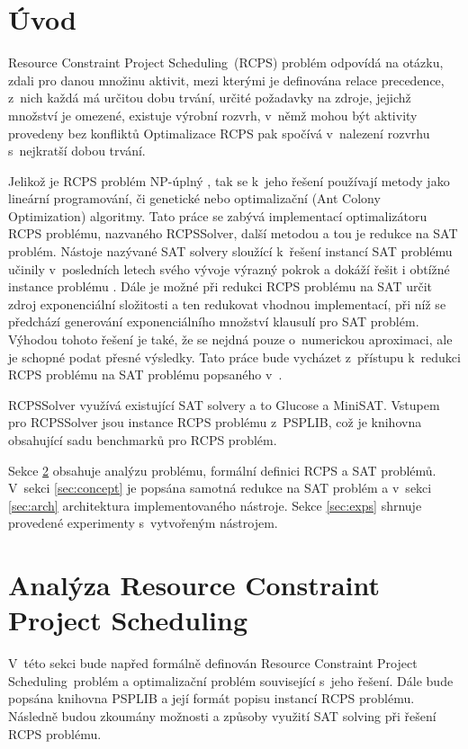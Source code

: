 \documentclass[a4paper, 12pt]{article}
\title{\rcps}
\author{Martin Hruška\\xhrusk16@stud.fit.vutbr.cz}
\date{}
\newcommand{\rcps}[0]{Resource Constraint Project Scheduling}
\begin{document}
\maketitle

\section{Úvod}
\label{sec:intro}
\rcps\ (RCPS) problém odpovídá na otázku, zdali pro danou množinu aktivit, mezi kterými je definována
relace precedence, z~nich každá má určitou dobu trvání, určité požadavky na zdroje, jejichž množství je omezené,
existuje výrobní rozvrh, v~němž mohou být aktivity provedeny bez konfliktů
Optimalizace RCPS pak spočívá v~nalezení rozvrhu s~nejkratší dobou trvání.

Jelikož je RCPS problém NP-úplný \cite{artigues:2007}, tak se k~jeho řešení používají metody jako
lineární programování, či genetické nebo optimalizační (Ant Colony Optimization) algoritmy.
Tato práce se zabývá implementací optimalizátoru RCPS problému, nazvaného RCPSSolver,
další metodou a tou je redukce na SAT problém.
Nástoje nazývané SAT solvery sloužící k~řešení instancí SAT problému učinily v~posledních letech
svého vývoje výrazný pokrok a dokáží řešit i obtížné instance problému \cite{www:minisat,www:glucose}.
Dále je možné při redukci RCPS problému na SAT určit zdroj exponenciální složitosti a ten
redukovat vhodnou implementací, při níž se předchází generování exponenciálního množství klausulí pro SAT problém.
Výhodou tohoto řešení je také, že se nejdná pouze o~numerickou aproximaci, ale je schopné podat přesné
výsledky.
Tato práce bude vycházet z~přístupu k~redukci RCPS problému na SAT problému popsaného v~\cite{horbach:10}.

RCPSSolver využívá existující SAT solvery a to Glucose a MiniSAT.
Vstupem pro RCPSSolver jsou instance RCPS problému z~PSPLIB, což je knihovna obsahující sadu benchmarků
pro RCPS problém.

Sekce \ref{sec:analysis} obsahuje analýzu problému, formální definici RCPS a SAT problémů.
V~sekci \ref{sec:concept} je popsána samotná redukce na SAT problém a v~sekci \ref{sec:arch}
architektura implementovaného nástroje.
Sekce \ref{sec:exps} shrnuje provedené experimenty s~vytvořeným nástrojem.

\section{Analýza \rcps}
\label{sec:analysis}
V~této sekci bude napřed formálně definován \rcps\ problém a optimalizační problém související s~jeho řešení.
Dále bude popsána knihovna PSPLIB a její formát popisu instancí RCPS problému.
Následně budou zkoumány možnosti a způsoby využití SAT solving při řešení RCPS problému.
\end{document}
